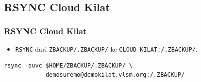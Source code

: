 \documentclass[xcolor=table, notheorems, hyperref={pdfpagelabels=false}]{beamer}
\begin{document}
\begin{frame}[fragile]
\section{RSYNC Cloud Kilat}
\frametitle{RSYNC Cloud Kilat}
\begin{itemize}
\item \texttt{RSYNC} dari \texttt{ZBACKUP/.ZBACKUP/} ke \texttt{CLOUD KILAT:/.ZBACKUP/}.
\end{itemize}
\begin{lstlisting}[basicstyle=\ttfamily\large]
         rsync -auvc $HOME/ZBACKUP/.ZBACKUP/ \
            demosuremo@demokilat.vlsm.org:/.ZBACKUP/
\end{lstlisting}
\end{frame}

\end{document}
